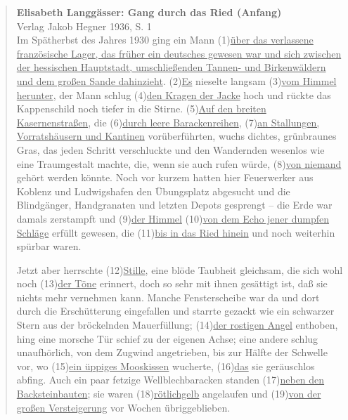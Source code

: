 \documentclass[12pt,a4paper,twoside]{article}
\newenvironment{nohyphens}{%
  \par
  \hyphenpenalty=10000
  \exhyphenpenalty=10000
  \sloppy
}{\par}
\begin{document}
\begin{nohyphens}
  \begin{quote}
    \textbf{Elisabeth Langgässer: Gang durch das Ried (Anfang)}\\
    Verlag Jakob Hegner 1936, S. 1\\[0.5\baselineskip]

    Im Spätherbst des Jahres 1930 ging ein Mann (1)\ul{über das verlassene französische Lager, das früher ein deutsches gewesen war und sich zwischen der hessischen Hauptstadt, umschließenden Tannen- und Birkenwäldern und dem großen Sande dahinzieht}.
    (2)\ul{Es} nieselte langsam (3)\ul{vom Himmel herunter}, der Mann schlug (4)\ul{den Kragen der Jacke} hoch und rückte das Kappenschild noch tiefer in die Stirne.
    (5)\ul{Auf den breiten Kasernenstraßen}, die (6)\ul{durch leere Barackenreihen}, (7)\ul{an Stallungen, Vorratshäusern und Kantinen} vorüberführten, wuchs dichtes, grünbraunes Gras, das jeden Schritt verschluckte und den Wandernden wesenlos wie eine Traumgestalt machte, die, wenn sie auch rufen würde, (8)\ul{von niemand} gehört werden könnte.
    Noch vor kurzem hatten hier Feuerwerker aus Koblenz und Ludwigshafen den Übungsplatz abgesucht und die Blindgänger, Handgranaten und letzten Depots gesprengt – die Erde war damals zerstampft und (9)\ul{der Himmel} (10)\ul{von dem Echo jener dumpfen Schläge} erfüllt gewesen, die (11)\ul{bis in das Ried hinein} und noch weiterhin spürbar waren.

      Jetzt aber herrschte (12)\ul{Stille}, eine blöde Taubheit gleichsam, die sich wohl noch (13)\ul{der Töne} erinnert, doch so sehr mit ihnen gesättigt ist, daß sie nichts mehr vernehmen kann.
      Manche Fensterscheibe war da und dort durch die Erschütterung eingefallen und starrte gezackt wie ein schwarzer Stern aus der bröckelnden Mauerfüllung; (14)\ul{der rostigen Angel} enthoben, hing eine morsche Tür schief zu der eigenen Achse; eine andere schlug unaufhörlich, von dem Zugwind angetrieben, bis zur Hälfte der Schwelle vor, wo (15)\ul{ein üppiges Mooskissen} wucherte, (16)\ul{das} sie geräuschlos abfing.
      Auch ein paar fetzige Wellblechbaracken standen (17)\ul{neben den Backsteinbauten}; sie waren (18)\ul{rötlichgelb} angelaufen und (19)\ul{von der großen Versteigerung} vor Wochen übriggeblieben.


\end{quote}
\end{nohyphens}
\end{document}
